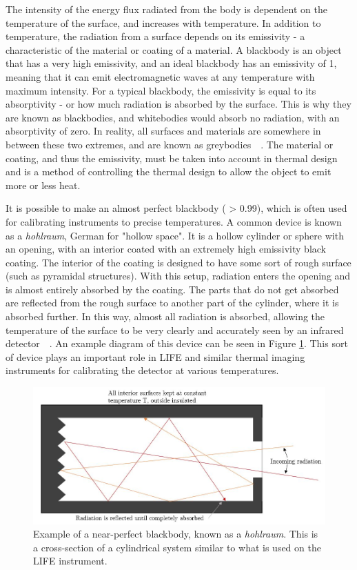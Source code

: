 The intensity of the energy flux radiated from the body is dependent on the temperature of the surface, and increases with temperature. In addition to temperature, the radiation from a surface depends on its emissivity {\textepsilon} - a characteristic of the material or coating of a material. A blackbody is an object that has a very high emissivity, and an ideal blackbody has an emissivity of 1, meaning that it can emit electromagnetic waves at any temperature with maximum intensity. For a typical blackbody, the emissivity is equal to its absorptivity {\textalpha} - or how much radiation is absorbed by the surface. This is why they are known as blackbodies, and whitebodies would absorb no radiation, with an absorptivity of zero. In reality, all surfaces and materials are somewhere in between these two extremes, and are known as greybodies~\citep{Heat_Transfer_Basics}~\citep{heat_transfer_textbook}. The material or coating, and thus the emissivity, must be taken into account in thermal design and is a method of controlling the thermal design to allow the object to emit more or less heat.

It is possible to make an almost perfect blackbody ({\textepsilon} {\textgreater} 0.99), which is often used for calibrating instruments to precise temperatures. A common device is known as a \textit{hohlraum}, German for "hollow space". It is a hollow cylinder or sphere with an opening, with an interior coated with an extremely high emissivity black coating. The interior of the coating is designed to have some sort of rough surface (such as pyramidal structures). With this setup, radiation enters the opening and is almost entirely absorbed by the coating. The parts that do not get absorbed are reflected from the rough surface to another part of the cylinder, where it is absorbed further. In this way, almost all radiation is absorbed, allowing the temperature of the surface to be very clearly and accurately seen by an infrared detector~\citep{Heat_Transfer_Basics}~\citep{heat_transfer_textbook}. An example diagram of this device can be seen in Figure \ref{fig:blackbody_example}. This sort of device plays an important role in LIFE and similar thermal imaging instruments for calibrating the detector at various temperatures.

 \begin{figure}
\centering
  \includegraphics[width=\linewidth]{chap2_images/blackbody_example.JPG}
  \caption{Example of a near-perfect blackbody, known as a \textit{hohlraum}. This is a cross-section of a cylindrical system similar to what is used on the LIFE instrument.}
  \label{fig:blackbody_example}
\end{figure}

